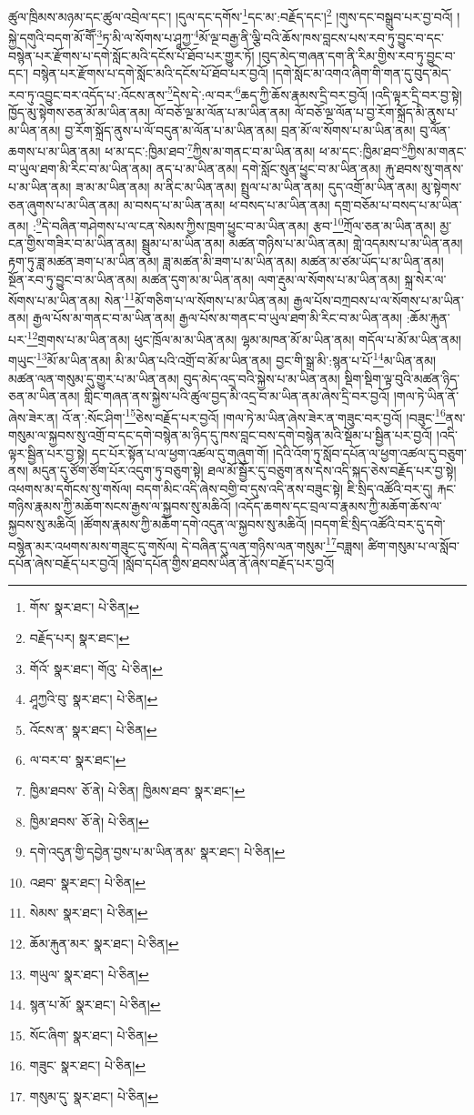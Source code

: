 ཚུལ་ཁྲིམས་མཉམ་དང་ཚུལ་འབྲེལ་དང་། །དུལ་དང་དགོས་\footnote{གོས་  སྣར་ཐང་།  པེ་ཅིན། }དང་མ་:བརྗོད་དང་།\footnote{བརྗོད་པར།  སྣར་ཐང་། } །གུས་དང་བསྒྲུབ་པར་བྱ་བའོ། །སྐྱེ་དགུའི་བདག་མོ་གཽ་\footnote{གོའོ་  སྣར་ཐང་། གོའུ་  པེ་ཅིན། }ཏ་མི་ལ་སོགས་པ་ཤཱཀྱ་\footnote{ཤཱཀྱའི་བུ་  སྣར་ཐང་།  པེ་ཅིན། }མོ་ལྔ་བརྒྱ་ནི་ལྕི་བའི་ཆོས་ཁས་བླངས་པས་རབ་ཏུ་བྱུང་བ་དང་བསྙེན་པར་རྫོགས་པ་དགེ་སློང་མའི་དངོས་པོ་ཐོབ་པར་གྱུར་ཏོ། །བུད་མེད་གཞན་དག་ནི་རིམ་གྱིས་རབ་ཏུ་བྱུང་བ་དང་། བསྙེན་པར་རྫོགས་པ་དགེ་སློང་མའི་དངོས་པོ་ཐོབ་པར་བྱའོ། །དགེ་སློང་མ་འགའ་ཞིག་གི་གན་དུ་བུད་མེད་རབ་ཏུ་འབྱུང་བར་འདོད་པ་:འོངས་ནས་\footnote{འོངས་ན་  སྣར་ཐང་།  པེ་ཅིན། }དེས་དེ་:ལ་བར་\footnote{ལ་བར་བ་  སྣར་ཐང་། }ཆད་ཀྱི་ཆོས་རྣམས་དྲི་བར་བྱའོ། །འདི་ལྟར་དྲི་བར་བྱ་སྟེ། ཁྱོད་མུ་སྟེགས་ཅན་མོ་མ་ཡིན་ནམ། ལོ་བཅོ་ལྔ་མ་ལོན་པ་མ་ཡིན་ནམ། ལོ་བཅོ་ལྔ་ལོན་པ་བྱ་རོག་སྐྲོད་མི་ནུས་པ་མ་ཡིན་ནམ། བྱ་རོག་སྐྲོད་ནུས་པ་ལོ་བདུན་མ་ལོན་པ་མ་ཡིན་ནམ། བྲན་མོ་ལ་སོགས་པ་མ་ཡིན་ནམ། བུ་ལོན་ཆགས་པ་མ་ཡིན་ནམ། ཕ་མ་དང་:ཁྱིམ་ཐབ་\footnote{ཁྱིམ་ཐབས་  ཅོ་ནེ།  པེ་ཅིན། ཁྱིམས་ཐབ་  སྣར་ཐང་། }ཀྱིས་མ་གནང་བ་མ་ཡིན་ནམ། ཕ་མ་དང་:ཁྱིམ་ཐབ་\footnote{ཁྱིམ་ཐབས་  ཅོ་ནེ།  པེ་ཅིན། }ཀྱིས་མ་གནང་བ་ཡུལ་ཐག་མི་རིང་བ་མ་ཡིན་ནམ། ནད་པ་མ་ཡིན་ནམ། དགེ་སློང་སུན་ཕྱུང་བ་མ་ཡིན་ནམ། རྐུ་ཐབས་སུ་གནས་པ་མ་ཡིན་ནམ། ཟ་མ་མ་ཡིན་ནམ། མ་ནིང་མ་ཡིན་ནམ། སྤྲུལ་པ་མ་ཡིན་ནམ། དུད་འགྲོ་མ་ཡིན་ནམ། མུ་སྟེགས་ཅན་ཞུགས་པ་མ་ཡིན་ནམ། མ་བསད་པ་མ་ཡིན་ནམ། ཕ་བསད་པ་མ་ཡིན་ནམ། དགྲ་བཅོམ་པ་བསད་པ་མ་ཡིན་ནམ། :\footnote{དགེ་འདུན་གྱི་དབྱེན་བྱས་པ་མ་ཡིན་ནམ་  སྣར་ཐང་།  པེ་ཅིན། }དེ་བཞིན་གཤེགས་པ་ལ་ངན་སེམས་ཀྱིས་ཁྲག་ཕྱུང་བ་མ་ཡིན་ནམ། རྩབ་\footnote{འཐབ་  སྣར་ཐང་།  པེ་ཅིན། }ཀྲོལ་ཅན་མ་ཡིན་ནམ། མྱ་ངན་གྱིས་གཟིར་བ་མ་ཡིན་ནམ། སྦྲུམ་པ་མ་ཡིན་ནམ། མཚན་གཉིས་པ་མ་ཡིན་ནམ། གླེ་འདམས་པ་མ་ཡིན་ནམ། རྟག་ཏུ་ཟླ་མཚན་ཟག་པ་མ་ཡིན་ནམ། ཟླ་མཚན་མི་ཟག་པ་མ་ཡིན་ནམ། མཚན་མ་ཙམ་ཡོད་པ་མ་ཡིན་ནམ། སྔོན་རབ་ཏུ་བྱུང་བ་མ་ཡིན་ནམ། མཚན་དུག་མ་མ་ཡིན་ནམ། ལག་རྡུམ་ལ་སོགས་པ་མ་ཡིན་ནམ། སྐྲ་སེར་ལ་སོགས་པ་མ་ཡིན་ནམ། སེན་\footnote{སེམས་  སྣར་ཐང་།  པེ་ཅིན། }མོ་གཅིག་པ་ལ་སོགས་པ་མ་ཡིན་ནམ། རྒྱལ་པོས་བཀྲབས་པ་ལ་སོགས་པ་མ་ཡིན་ནམ། རྒྱལ་པོས་མ་གནང་བ་མ་ཡིན་ནམ། རྒྱལ་པོས་མ་གནང་བ་ཡུལ་ཐག་མི་རིང་བ་མ་ཡིན་ནམ། :ཆོམ་རྐུན་པར་\footnote{ཆོམ་རྐུན་མར་  སྣར་ཐང་།  པེ་ཅིན། }གྲགས་པ་མ་ཡིན་ནམ། ཕུང་ཁྲོལ་མ་མ་ཡིན་ནམ། ལྷམ་མཁན་མོ་མ་ཡིན་ནམ། གདོལ་པ་མོ་མ་ཡིན་ནམ། གཡུང་\footnote{གཡུལ་  སྣར་ཐང་།  པེ་ཅིན། }མོ་མ་ཡིན་ནམ། མི་མ་ཡིན་པའི་འགྲོ་བ་མོ་མ་ཡིན་ནམ། བྱང་གི་སྒྲ་མི་:སྙན་པ་པོ་\footnote{སྙན་པ་མོ་  སྣར་ཐང་།  པེ་ཅིན། }མ་ཡིན་ནམ། མཚན་ལན་གསུམ་དུ་གྱུར་པ་མ་ཡིན་ནམ། བུད་མེད་འདྲ་བའི་སྐྱེས་པ་མ་ཡིན་ནམ། སྡིག་སྡིག་ལྟ་བུའི་མཚན་ཉིད་ཅན་མ་ཡིན་ནམ། གླིང་གཞན་ནས་སྐྱེས་པའི་ཚུལ་བྱད་མི་འདྲ་བ་མ་ཡིན་ནམ་ཞེས་དྲི་བར་བྱའོ། །གལ་ཏེ་ཡིན་ནོ་ཞེས་ཟེར་ན། འོ་ན་:སོང་ཤིག་\footnote{སོང་ཞིག་  སྣར་ཐང་།  པེ་ཅིན། }ཅེས་བརྗོད་པར་བྱའོ། །གལ་ཏེ་མ་ཡིན་ཞེས་ཟེར་ན་གཟུང་བར་བྱའོ། །བཟུང་\footnote{གཟུང་  སྣར་ཐང་།  པེ་ཅིན། }ནས་གསུམ་ལ་སྐྱབས་སུ་འགྲོ་བ་དང་དགེ་བསྙེན་མ་ཉིད་དུ་ཁས་བླང་བས་དགེ་བསྙེན་མའི་སྡོམ་པ་སྦྱིན་པར་བྱའོ། །འདི་ལྟར་སྦྱིན་པར་བྱ་སྟེ། དང་པོར་སྟོན་པ་ལ་ཕྱག་འཚལ་དུ་གཞུག་གོ། །དེའི་འོག་ཏུ་སློབ་དཔོན་ལ་ཕྱག་འཚལ་དུ་བཅུག་ནས། མདུན་དུ་ཙོག་ཙོག་པོར་འདུག་ཏུ་བཅུག་སྟེ། ཐལ་མོ་སྦྱོར་དུ་བཅུག་ནས་དེས་འདི་སྐད་ཅེས་བརྗོད་པར་བྱ་སྟེ། འཕགས་མ་དགོངས་སུ་གསོལ། བདག་མིང་འདི་ཞེས་བགྱི་བ་དུས་འདི་ནས་བཟུང་སྟེ། ཇི་སྲིད་འཚོའི་བར་དུ། རྐང་གཉིས་རྣམས་ཀྱི་མཆོག་སངས་རྒྱས་ལ་སྐྱབས་སུ་མཆིའོ། །འདོད་ཆགས་དང་བྲལ་བ་རྣམས་ཀྱི་མཆོག་ཆོས་ལ་སྐྱབས་སུ་མཆིའོ། །ཚོགས་རྣམས་ཀྱི་མཆོག་དགེ་འདུན་ལ་སྐྱབས་སུ་མཆིའོ། །བདག་ཇི་སྲིད་འཚོའི་བར་དུ་དགེ་བསྙེན་མར་འཕགས་མས་གཟུང་དུ་གསོལ། དེ་བཞིན་དུ་ལན་གཉིས་ལན་གསུམ་\footnote{གསུམ་དུ་  སྣར་ཐང་།  པེ་ཅིན། }བཟླས། ཚིག་གསུམ་པ་ལ་སློབ་དཔོན་ཞེས་བརྗོད་པར་བྱའོ། །སློབ་དཔོན་གྱིས་ཐབས་ཡིན་ནོ་ཞེས་བརྗོད་པར་བྱའོ། 